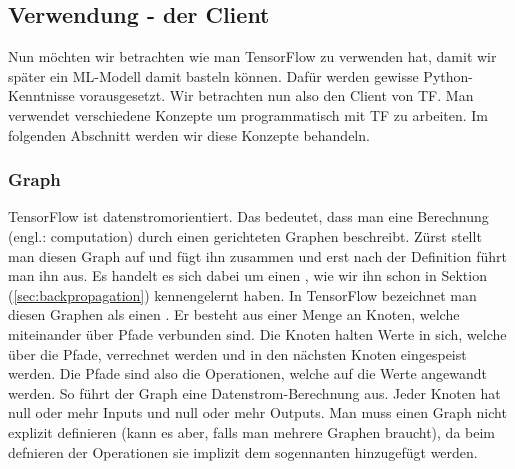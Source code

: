 \subsection{Verwendung - der Client}
Nun möchten wir betrachten wie man TensorFlow zu verwenden hat, damit wir
später ein ML-Modell damit basteln können. Dafür werden gewisse
Python-Kenntnisse vorausgesetzt. Wir betrachten nun also
den Client von TF. Man verwendet verschiedene Konzepte um
programmatisch mit TF zu arbeiten. Im folgenden Abschnitt werden wir diese
Konzepte behandeln.

\subsubsection{Graph}
TensorFlow ist datenstromorientiert. Das bedeutet, dass man eine Berechnung
(engl.: computation) durch einen gerichteten Graphen beschreibt. Zürst stellt
man diesen Graph auf und fügt ihn zusammen und erst nach der Definition führt man
ihn aus.
Es handelt es sich dabei um einen , wie wir ihn schon in Sektion (\ref{sec:backpropagation}) kennengelernt
haben. In TensorFlow bezeichnet man diesen Graphen als einen .
\para{}
Er besteht aus einer Menge an Knoten, welche miteinander über Pfade
verbunden sind. Die Knoten halten Werte in sich, welche über die Pfade,
verrechnet werden und in den nächsten Knoten eingespeist werden. Die Pfade sind also die Operationen, welche auf die Werte
angewandt werden. So führt der Graph eine Datenstrom-Berechnung aus.
Jeder Knoten hat null oder mehr Inputs und null oder mehr Outputs.
\para{}
Man muss einen Graph nicht explizit definieren (kann es aber, falls man mehrere
Graphen braucht), da beim defnieren der Operationen sie implizit dem
sogennanten  hinzugefügt werden.

